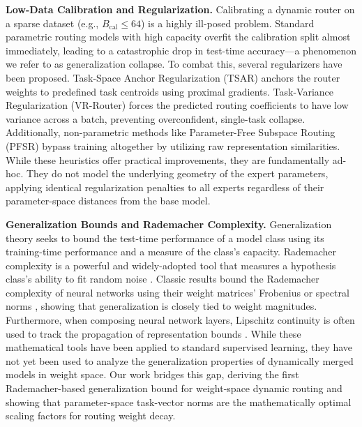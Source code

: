 \textbf{Low-Data Calibration and Regularization.} Calibrating a dynamic router on a sparse dataset (e.g., $B_{\text{cal}} \le 64$) is a highly ill-posed problem. Standard parametric routing models with high capacity overfit the calibration split almost immediately, leading to a catastrophic drop in test-time accuracy—a phenomenon we refer to as generalization collapse. To combat this, several regularizers have been proposed. Task-Space Anchor Regularization (TSAR) anchors the router weights to predefined task centroids using proximal gradients. Task-Variance Regularization (VR-Router) forces the predicted routing coefficients to have low variance across a batch, preventing overconfident, single-task collapse. Additionally, non-parametric methods like Parameter-Free Subspace Routing (PFSR) bypass training altogether by utilizing raw representation similarities. While these heuristics offer practical improvements, they are fundamentally ad-hoc. They do not model the underlying geometry of the expert parameters, applying identical regularization penalties to all experts regardless of their parameter-space distances from the base model.

\textbf{Generalization Bounds and Rademacher Complexity.} Generalization theory seeks to bound the test-time performance of a model class using its training-time performance and a measure of the class's capacity. Rademacher complexity is a powerful and widely-adopted tool that measures a hypothesis class's ability to fit random noise \cite{bartlett2002rademacher, kearns89}. Classic results bound the Rademacher complexity of neural networks using their weight matrices' Frobenius or spectral norms \cite{kakade2008complexity, koltchinskii2002empirical, bousquet2002stability}, showing that generalization is closely tied to weight magnitudes. Furthermore, when composing neural network layers, Lipschitz continuity is often used to track the propagation of representation bounds \cite{mohri2018foundations, shalev2014understanding}. While these mathematical tools have been applied to standard supervised learning, they have not yet been used to analyze the generalization properties of dynamically merged models in weight space. Our work bridges this gap, deriving the first Rademacher-based generalization bound for weight-space dynamic routing and showing that parameter-space task-vector norms are the mathematically optimal scaling factors for routing weight decay.
